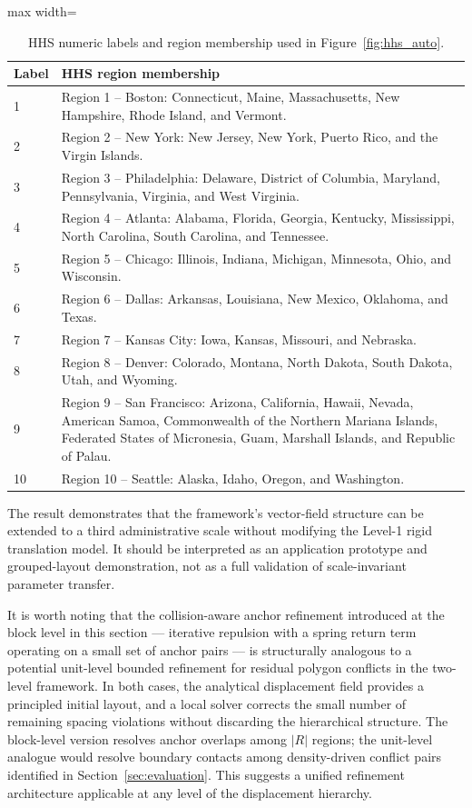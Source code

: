 \documentclass[12pt, a4paper]{article}
\numberwithin{equation}{section}
\begin{document}
\begin{table}[H]
\centering
\caption{HHS numeric labels and region membership used in Figure~\ref{fig:hhs_auto}.}
\label{tab:hhs_labels}
\begin{adjustbox}{max width=\textwidth}
\begin{tabular}{lp{}}
\toprule
\textbf{Label} & \textbf{HHS region membership} \\
\midrule
1 & Region 1 -- Boston: Connecticut, Maine, Massachusetts, New Hampshire, Rhode Island, and Vermont. \\
2 & Region 2 -- New York: New Jersey, New York, Puerto Rico, and the Virgin Islands. \\
3 & Region 3 -- Philadelphia: Delaware, District of Columbia, Maryland, Pennsylvania, Virginia, and West Virginia. \\
4 & Region 4 -- Atlanta: Alabama, Florida, Georgia, Kentucky, Mississippi, North Carolina, South Carolina, and Tennessee. \\
5 & Region 5 -- Chicago: Illinois, Indiana, Michigan, Minnesota, Ohio, and Wisconsin. \\
6 & Region 6 -- Dallas: Arkansas, Louisiana, New Mexico, Oklahoma, and Texas. \\
7 & Region 7 -- Kansas City: Iowa, Kansas, Missouri, and Nebraska. \\
8 & Region 8 -- Denver: Colorado, Montana, North Dakota, South Dakota, Utah, and Wyoming. \\
9 & Region 9 -- San Francisco: Arizona, California, Hawaii, Nevada, American Samoa, Commonwealth of the Northern Mariana Islands, Federated States of Micronesia, Guam, Marshall Islands, and Republic of Palau. \\
10 & Region 10 -- Seattle: Alaska, Idaho, Oregon, and Washington. \\
\bottomrule
\end{tabular}
\end{adjustbox}
\end{table}

The result demonstrates that the framework's vector-field structure can be extended to a third administrative scale without modifying the Level-1 rigid translation model. It should be interpreted as an application prototype and grouped-layout demonstration, not as a full validation of scale-invariant parameter transfer.

It is worth noting that the collision-aware anchor refinement introduced at the block level in this section --- iterative repulsion with a spring return term operating on a small set of anchor pairs --- is structurally analogous to a potential unit-level bounded refinement for residual polygon conflicts in the two-level framework. In both cases, the analytical displacement field provides a principled initial layout, and a local solver corrects the small number of remaining spacing violations without discarding the hierarchical structure. The block-level version resolves anchor overlaps among $|R|$ regions; the unit-level analogue would resolve boundary contacts among density-driven conflict pairs identified in Section~\ref{sec:evaluation}. This suggests a unified refinement architecture applicable at any level of the displacement hierarchy.
\end{document}
